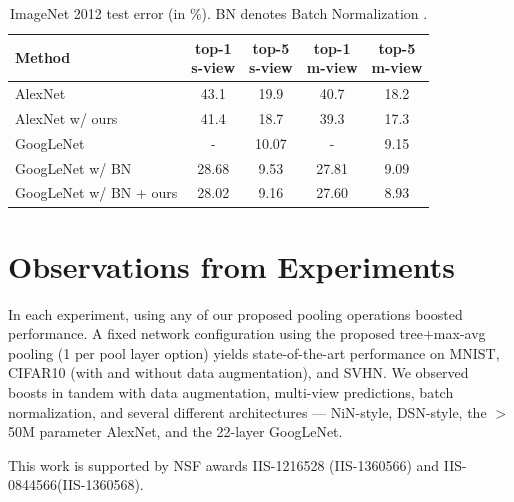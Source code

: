 \documentclass[twoside]{article}
\begin{document}
\begin{table}[!htp]
\vspace{-3mm}
{\footnotesize
\begin{center}
\caption{\label{tab:imagenet} ImageNet 2012 test error (in \%). BN denotes Batch Normalization \cite{ioffe2015batch}.}
\vspace{-3mm}
\begin{tabular}{lcccc} 
\multicolumn{1}{l}{Method}                  &\shortstack{top-1 \\ s-view} & \shortstack{top-5 \\ s-view} &\shortstack{top-1 \\ m-view} & \shortstack{top-5 \\ m-view}
\\ \hline 
\scriptsize{AlexNet \cite{krizhevsky2012imagenet} }      & 43.1  & 19.9  & 40.7   & 18.2 \\
\scriptsize{AlexNet w/ ours  }                           & 41.4  & 18.7  & 39.3   & 17.3 \\
\hline 
\scriptsize{GoogLeNet \cite{szegedy2014going}  }         & -     & 10.07 & -      & 9.15 \\
\scriptsize{GoogLeNet w/ BN    }                         & 28.68 &  9.53 & 27.81  & 9.09 \\
\scriptsize{GoogLeNet w/ BN + ours }                     & 28.02 &  9.16 & 27.60  & 8.93 \\ 
\hline 
\end{tabular}
\end{center}
}
\vspace{-4mm}
\end{table}

\vspace{-4mm}
\section{Observations from Experiments}
\vspace{-4mm}
In each experiment, using any of our proposed pooling operations boosted performance.
A fixed network configuration using the proposed tree+max-avg pooling (1
per pool layer option) yields state-of-the-art performance
on MNIST, CIFAR10 (with and without data augmentation), and SVHN.
We observed boosts in tandem with data augmentation, multi-view predictions, batch normalization,
and several different architectures --- NiN-style, DSN-style, the $>$50M parameter AlexNet, and the 22-layer GoogLeNet.

 This work is supported by NSF awards IIS-1216528 (IIS-1360566) and IIS-0844566(IIS-1360568).
\end{document}
